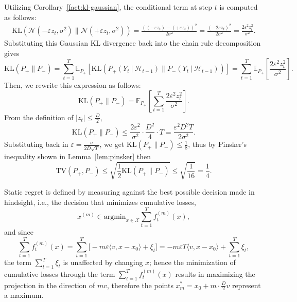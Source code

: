 \documentclass[journal,onecolumn]{IEEEtran}
\theoremstyle{plain}
\theoremstyle{definition}
\theoremstyle{remark}
\begin{document}
{Utilizing Corollary~\ref{fact:kl-gaussian}, the conditional term at step $t$ is computed as follows:
\begin{align*}
\mathrm{KL}( \mathcal{N}(-\varepsilon z_t,\sigma^2) \| \mathcal{N}(+\varepsilon z_t,\sigma^2))  =
\frac{((- \varepsilon z_t ) - (+ \varepsilon z_t ))^2}{2 \sigma^2} =
\frac{(-2 \varepsilon z_t )^2}{2 \sigma^2} =
\frac{2 \varepsilon^2 z_t^2}{\sigma^2}.
\end{align*}
Substituting this Gaussian KL divergence back into the chain rule decomposition gives
\begin{equation*}
\mathrm{KL}(P_+ \| P_-) =\sum_{t=1}^T \mathbb{E}_{P_+}\left[ \mathrm{KL}(P_+(Y_t \ | \ \mathcal{H}_{t-1})\| P_-(Y_t \ | \ \mathcal{H}_{t-1})) \right] = \sum_{t=1}^T \mathbb{E}_{P_+}\left[ \frac{2 \varepsilon^2 z_t^2}{\sigma^2} \right] .
\end{equation*}
Then, we rewrite this expression as follows:
\begin{equation*}
\mathrm{KL}(P_+ \| P_-) =\mathbb{E}_{P_+}\left[ \sum_{t=1}^T \frac{2 \varepsilon^2 z_t^2}{\sigma^2} \right].
\end{equation*}
From the definition of $|z_t| \leq \frac{D}{2}$,
\begin{equation*}
\mathrm{KL}(P_+ \| P_-) \leq \frac{2 \varepsilon^2}{\sigma^2} \cdot \frac{D^2}{4} \cdot T=\frac{\varepsilon^2 D^2 T}{2\sigma^2}.
\end{equation*}
Substituting back in $ \varepsilon = \frac{\sigma}{2D\sqrt{T}} $, we get $ \mathrm{KL}(P_+ \| P_-) \leq \frac{1}{8}$, thus by Pinsker's inequality shown in Lemma~\ref{lem:pinsker} then
\begin{equation}\label{eq:pinsker}
\mathrm{TV}(P_+,P_-)\leq \sqrt{ \frac{1}{2} \mathrm{KL}(P_+ \|P_-)}\leq \sqrt{ \frac{1}{16}} =\frac{1}{4} .
\end{equation}

Static regret is defined by measuring against the best possible decision made in hindsight, i.e., the decision that minimizes cumulative losses,
\begin{equation*}
x^{(m)} \in \text{argmin}_{x\in \mathcal{X}} \sum_{t=1}^{T} f_t^{(m)}(x) ,
\end{equation*}
and since
\begin{equation*}
\sum_{t=1}^T f_t^{(m)}(x) = \sum_{t=1}^T \Big[ -m\varepsilon \langle v,x-x_0 \rangle + \xi_t \Big] = -m\varepsilon T\langle v,x-x_0 \rangle + \sum_{t=1}^T \xi_t,
\end{equation*}
the term \( \sum_{t=1}^T \xi_t \) is unaffected by changing \( x \); hence the minimization of cumulative losses through the term \( \sum_{t=1}^T f_t^{(m)}(x) \) results in maximizing the projection in the direction of \( mv \), therefore the points \( x_m^* = x_0 +m \cdot \frac{D}{2} v \) represent a maximum.

}
\end{document}
